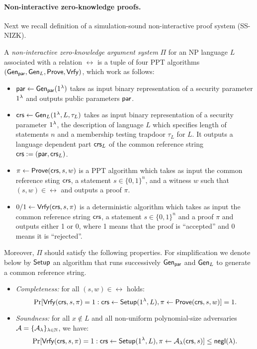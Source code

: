\paragraph{Non-interactive zero-knowledge proofs.}
Next we recall definition of a simulation-sound non-interactive proof system (SS-NIZK). 

\begin{definition} 
A \emph{non-interactive zero-knowledge argument system} $\Pi$ for an NP language $L$ associated with a relation $\rel$ is a tuple of four PPT algorithms $(\mathsf{Gen}_{\mathsf{par}}, \mathsf{Gen}_L, \mathsf{Prove}, \mathsf{Vrfy})$, which work as follows:
\begin{itemize}
\item $\mathsf{par} \leftarrow \mathsf{Gen}_{\mathsf{par}}(1{^{\lambda}})$ takes as input binary representation of a security parameter $1{^{\lambda}}$ and outputs public parameters $\mathsf{par}$.
\item $\mathsf{crs} \leftarrow \mathsf{Gen}_L(1{^{\lambda}}, L, \tau_L)$ takes as input binary representation of a security parameter $1{^{\lambda}}$, the description of language $L$ which specifies length of statements $n$ and a membership testing trapdoor $\tau_L$ for $L$.  It outputs a language dependent part $\mathsf{crs}_L$ of the common reference string $\mathsf{crs}:=(\mathsf{par}, \mathsf{crs}_L)$. 
\item $\pi \leftarrow \mathsf{Prove}(\mathsf{crs},s,w)$ is a PPT algorithm which takes as input the common reference sting $\mathsf{crs}$, a statement $s \in \{0,1\}^n$, and a witness $w$ such that $(s,w) \in \rel$ and outputs a proof $\pi$.
\item $0/1 \leftarrow \mathsf{Vrfy}(\mathsf{crs}, s, \pi)$ is a deterministic algorithm which takes as input the common reference string $\mathsf{crs}$, a statement $s\in \{0,1\}^n$ and a proof $\pi$ and outputs either 1 or 0, where 1 means that the proof is ``accepted'' and 0 means it is ``rejected''.
\end{itemize}
Moreover, $\Pi$ should satisfy the following properties. For simplification we denote below by $\mathsf{Setup}$ an algorithm that runs successively $\mathsf{Gen}_{\mathsf{par}}$ and $\mathsf{Gen}_L$ to generate a common reference string. 
\begin{itemize}
\item \emph{Completeness:}  for all $(s, w) \in \rel$ holds:
\[\Pr[\mathsf{Vrfy}(\mathsf{crs}, s,\pi)=1:\mathsf{crs} \leftarrow \mathsf{Setup}(1{^{\lambda}}, L), \pi \leftarrow \mathsf{Prove}(\mathsf{crs}, s,w)] =1.\] 
\item \emph{Soundness:} for all $x \notin L$ and all non-uniform polynomial-size adversaries $\mathcal{A} = \{\mathcal{A}_{\lambda}\}_{\lambda \in \mathbb{N}}$, we have:
\[\Pr[\mathsf{Vrfy}(\mathsf{crs}, s,\pi)=1:\mathsf{crs} \leftarrow \mathsf{Setup}(1{^{\lambda}}, L), \pi \leftarrow \mathcal{A}_{\lambda}(\mathsf{crs}, s)] \leq \mathsf{negl}(\lambda).\] 

\end{itemize}
\end{definition}
